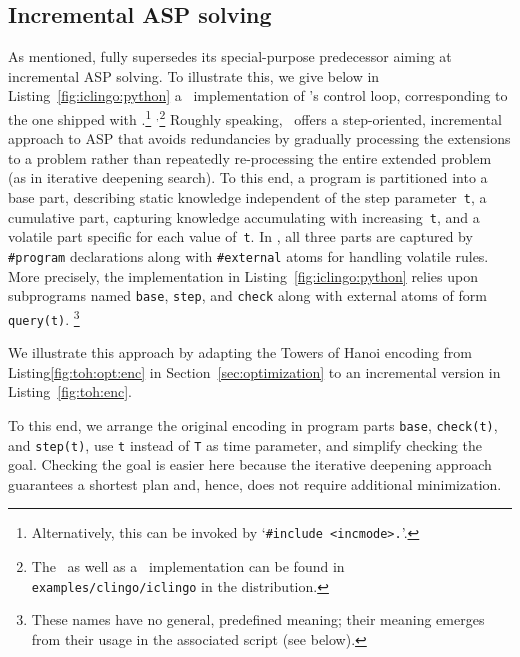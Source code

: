 
\subsection{Incremental ASP solving}
\label{sec:iclingo}

As mentioned, \clingo{} fully supersedes its special-purpose predecessor \iclingo{} aiming at incremental ASP solving.
To illustrate this,
we give below in Listing~\ref{fig:iclingo:python} a \python\ implementation of \iclingo's control loop,
corresponding to the one shipped with \clingo.\footnote{Alternatively, this can be invoked by `\lstinline{#include <incmode>.}'.}%
${}^,$\footnote{The \python\ as well as a \lua\ implementation can be found in \texttt{examples/clingo/iclingo} in the \clingo{} distribution.}
%
Roughly speaking,
\iclingo\ offers a step-oriented, incremental approach to ASP that avoids redundancies by gradually processing the extensions to a problem
rather than repeatedly re-processing the entire extended problem (as in iterative deepening search).
%
To this end, a program is partitioned into a
base part, describing static knowledge independent of the step parameter~\lstinline{t},
a cumulative part, capturing knowledge accumulating with increasing~\lstinline{t},
and
a volatile part specific for each value of~\lstinline{t}.
%
%
In \clingo, all three parts are captured by \lstinline{#program} declarations
along with \lstinline{#external} atoms for handling volatile rules.
More precisely,
the implementation in Listing~\ref{fig:iclingo:python} relies upon subprograms named \lstinline{base}, \lstinline{step}, and \lstinline{check}
along with external atoms of form \lstinline{query(t)}.%
\footnote{These names have no general, predefined meaning; their meaning emerges from their usage in the associated script (see below).}

We illustrate this approach by adapting the Towers of Hanoi encoding from Listing\ref{fig:toh:opt:enc} in Section~\ref{sec:optimization}
to an incremental version in Listing~\ref{fig:toh:enc}.

To this end,
we arrange the original encoding in program parts \lstinline{base}, \lstinline{check(t)}, and \lstinline{step(t)}, 
use \lstinline{t} instead of \lstinline{T} as time parameter, and 
simplify checking the goal.
%
Checking the goal is easier here because the iterative deepening approach guarantees a shortest plan and, hence, does not require additional minimization.

